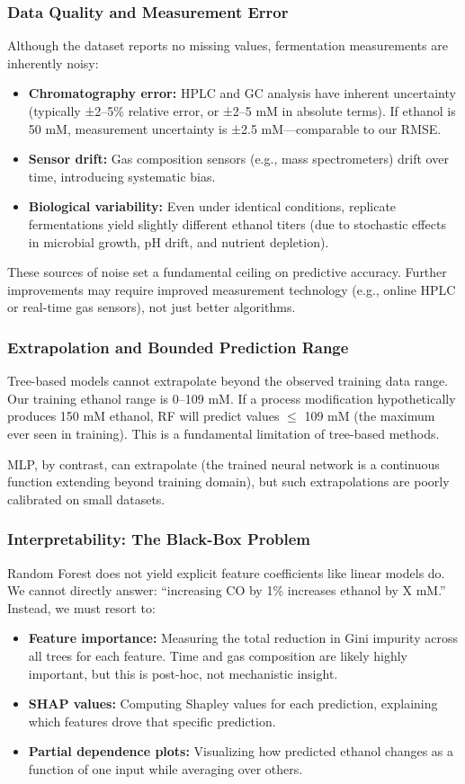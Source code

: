 \documentclass[conference]{IEEEtran}
\begin{document}
\subsubsection{Data Quality and Measurement Error}
Although the dataset reports no missing values, fermentation measurements are inherently noisy:
\begin{itemize}
\item \textbf{Chromatography error:} HPLC and GC analysis have inherent uncertainty (typically ±2–5\% relative error, or ±2–5 mM in absolute terms). If ethanol is 50 mM, measurement uncertainty is ±2.5 mM—comparable to our RMSE.
\item \textbf{Sensor drift:} Gas composition sensors (e.g., mass spectrometers) drift over time, introducing systematic bias.
\item \textbf{Biological variability:} Even under identical conditions, replicate fermentations yield slightly different ethanol titers (due to stochastic effects in microbial growth, pH drift, and nutrient depletion).
\end{itemize}

These sources of noise set a fundamental ceiling on predictive accuracy. Further improvements may require improved measurement technology (e.g., online HPLC or real-time gas sensors), not just better algorithms.

\subsubsection{Extrapolation and Bounded Prediction Range}
Tree-based models cannot extrapolate beyond the observed training data range. Our training ethanol range is 0--109 mM. If a process modification hypothetically produces 150 mM ethanol, RF will predict values $\leq$ 109 mM (the maximum ever seen in training). This is a fundamental limitation of tree-based methods.

MLP, by contrast, can extrapolate (the trained neural network is a continuous function extending beyond training domain), but such extrapolations are poorly calibrated on small datasets.

\subsubsection{Interpretability: The Black-Box Problem}
Random Forest does not yield explicit feature coefficients like linear models do. We cannot directly answer: ``increasing CO by 1\% increases ethanol by X mM.'' Instead, we must resort to:
\begin{itemize}
\item \textbf{Feature importance:} Measuring the total reduction in Gini impurity across all trees for each feature. Time and gas composition are likely highly important, but this is post-hoc, not mechanistic insight.
\item \textbf{SHAP values:} Computing Shapley values for each prediction, explaining which features drove that specific prediction.
\item \textbf{Partial dependence plots:} Visualizing how predicted ethanol changes as a function of one input while averaging over others.
\end{itemize}
\end{document}
